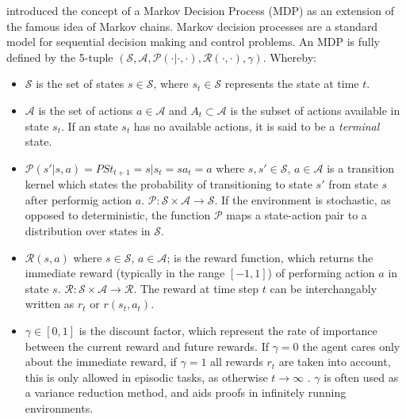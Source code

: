 \documentclass{../main.tex}{subfiles}
\begin{document}
\cite{Bellman1957} introduced the concept of a Markov Decision Process (MDP) as an extension of the famous idea of Markov chains. Markov decision processes are a standard model for sequential decision making and control problems. An MDP is fully defined by the 5-tuple $(\mathcal{S}, \mathcal{A}, \mathcal{P(\cdot | \cdot, \cdot)}, \mathcal{R(\cdot, \cdot)}, \gamma)$. Whereby:

\begin{itemize}
\item $\mathcal{S}$ is the set of states $s \in \mathcal{S}$, where $s_t \in \mathcal{S}$ represents the state at time $t$.
\item $\mathcal{A}$ is the set of actions $a \in \mathcal{A}$ and $A_t \subset \mathcal{A}$ is the subset of actions available in state $s_t$. If an state $s_t$ has no available actions, it is said to be a \textit{terminal} state.
\item $\mathcal{P}(s' | s, a) = P{St_{t+1} = s | s_t = s a_t = a}$ where $s, s' \in \mathcal{S}$, $a \in \mathcal{A}$ is a transition kernel which states the probability of transitioning to state $s'$ from state $s$ after performig action $a$. $\mathcal{P}: \mathcal{S} \times \mathcal{A} \to \mathcal{S}$. If the environment is stochastic, as opposed to deterministic, the function $\mathcal{P}$ maps a state-action pair to a distribution over states in $\mathcal{S}$. %
\item $\mathcal{R}(s, a)$ where $s \in \mathcal{S}$, $a \in \mathcal{A}$; is the reward function, which returns the immediate reward (typically in the range $[-1,1]$) of performing action $a$ in state $s$. $\mathcal{R}: \mathcal{S} \times \mathcal{A} \to \mathbb{\mathcal{R}}$. The reward at time step $t$ can be interchangably written as $r_t$ or $r(s_t, a_t)$.
\item $\gamma \in [0,1]$ is the discount factor, which represent the rate of importance between the current reward and future rewards. If $\gamma = 0$ the agent cares only about the immediate reward, if $\gamma = 1$ all rewards $r_t$ are taken into account, this is only allowed in episodic tasks, as otherwise $t \rightarrow \infty$ \citep{Sutton1999}. $\gamma$ is often used as a variance reduction method, and aids proofs in infinitely running environments.
\end{itemize}

\end{document}
